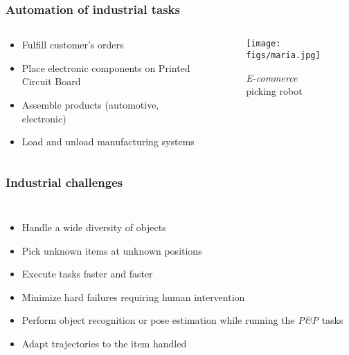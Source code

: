 \documentclass[aspectratio=1610]{beamer}
\begin{document}
\begin{frame}
\frametitle{Automation of industrial tasks}
\begin{columns}
\begin{column}{0.5\textwidth}
  \begin{itemize}\itemsep1em
    \justifying
    \item \textcolor{Ocean}{Fulfill} customer's orders
    \item \textcolor{Ocean}{Place} electronic components on Printed Circuit Board
    \item \textcolor{Ocean}{Assemble} products (automotive, electronic)
    \item \textcolor{Ocean}{Load} and \textcolor{Ocean}{unload} manufacturing systems
  \end{itemize}
\end{column}
\begin{column}{0.5\textwidth}  %
  \begin{figure}
    \centering
    \texttt{[image: figs/maria.jpg]}
    \caption{\textit{E-commerce} picking robot}
  \end{figure}
\end{column}
\end{columns}

\end{frame}

\begin{frame}
\frametitle{Industrial challenges}
\begin{columns}
\column{37em}
\begin{itemize}\itemsep1em
  \justifying
  \item Handle a wide \textcolor{Ocean}{diversity of objects}
  \item Pick \textcolor{Ocean}{unknown items} at \textcolor{Ocean}{unknown positions}
  \item Execute tasks \textcolor{Ocean}{faster and faster}
  \item \textcolor{Ocean}{Minimize hard failures} requiring human intervention
  \item Perform \textcolor{Ocean}{object recognition} or \textcolor{Ocean}{pose estimation} while running the \textit{P\&P} tasks
  \item \textcolor{Ocean}{Adapt trajectories} to the item handled
\end{itemize}
\end{columns}
\end{frame}
\end{document}
